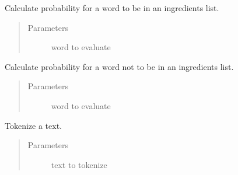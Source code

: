 \documentclass[letterpaper,10pt,english]{sphinxmanual}
\begin{document}
\begin{fulllineitems}
\begin{fulllineitems}
\begin{quote}
\begin{description}
\begin{itemize}
\end{itemize}

\end{description}\end{quote}

\end{fulllineitems}


\begin{fulllineitems}
\label{\detokenize{api:ingredient_extractor.IngredientExtractor.prob_lm}}
Calculate probability for a word to be in an ingredients list.
\begin{quote}\begin{description}
\item[{Parameters}] \leavevmode
{} \textendash{} word to evaluate

\end{description}\end{quote}

\end{fulllineitems}


\begin{fulllineitems}
\label{\detokenize{api:ingredient_extractor.IngredientExtractor.prob_nlm}}
Calculate probability for a word not to be in an ingredients list.
\begin{quote}\begin{description}
\item[{Parameters}] \leavevmode
{} \textendash{} word to evaluate

\end{description}\end{quote}

\end{fulllineitems}


\begin{fulllineitems}
\label{\detokenize{api:ingredient_extractor.IngredientExtractor.tokenize_words}}
Tokenize a text.
\begin{quote}\begin{description}
\item[{Parameters}] \leavevmode
{} \textendash{} text to tokenize


\end{description}
\end{quote}
\end{fulllineitems}
\end{fulllineitems}
\end{document}
